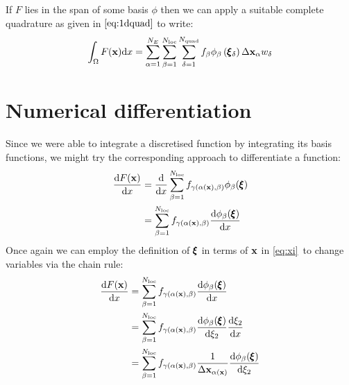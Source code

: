 \documentclass[a4paper, 11pt]{book}
\begin{document}
If $F$ lies in the span of some basis $\phi$ then we can apply a suitable
complete quadrature as given in $\eqref{eq:1dquad}$ to write:
\begin{equation}
  \int_\Omega F(\mathbf{x})\mathrm{d} x = \sum_{\alpha=1}^{N_E}\sum_{\beta=1}^{N_\mathrm{loc}}
  \sum_{\delta=1}^{N_\mathrm{quad}} f_{\beta}
  \phi_{\beta}\left(\pmb{\xi}_\delta\right)\Delta\mathbf{x}_\alpha w_\delta
\end{equation}

\section{Numerical differentiation}

Since we were able to integrate a discretised function by integrating its
basis functions, we might try the corresponding approach to differentiate a
function:
\begin{equation}
  \begin{split}
    \frac{\mathrm{d} F(\mathbf{x})}{\mathrm{d} x}&=\frac{\mathrm{d}}{\mathrm{d} x}\sum_{\beta=1}^{N_\mathrm{loc}}
    f_{\gamma(\alpha(\mathbf{x}),\beta)}\phi_{\beta}(\pmb{\xi})\\
    &=\sum_{\beta=1}^{N_\mathrm{loc}}
    f_{\gamma(\alpha(\mathbf{x}),\beta)}\frac{\mathrm{d} \phi_{\beta}(\pmb{\xi})}{\mathrm{d} x}
  \end{split}
\end{equation}
Once again we can employ the definition of $\pmb{\xi}$ in terms of $\mathbf{x}$ in
\eqref{eq:xi}\ to change variables via the chain rule:
\begin{equation}\label{eq:1dpointdfdx}
  \begin{split}
    \frac{\mathrm{d} F(\mathbf{x})}{\mathrm{d} x}&=\sum_{\beta=1}^{N_\mathrm{loc}}
    f_{\gamma(\alpha(\mathbf{x}),\beta)}\frac{\mathrm{d} \phi_{\beta}(\pmb{\xi})}{\mathrm{d} x}\\
    &=\sum_{\beta=1}^{N_\mathrm{loc}}
    f_{\gamma(\alpha(\mathbf{x}),\beta)}\frac{\mathrm{d} \phi_{\beta}(\pmb{\xi})}{\mathrm{d} \xi_2}
    \frac{\mathrm{d}\xi_2}{\mathrm{d} x}\\
    &=\sum_{\beta=1}^{N_\mathrm{loc}}
    f_{\gamma(\alpha(\mathbf{x}),\beta)}\frac{1}{\Delta\mathbf{x}_{\alpha(\mathbf{x})}}\frac{\mathrm{d} \phi_{\beta}(\pmb{\xi})}{\mathrm{d} \xi_2}\\
  \end{split}
\end{equation}
\end{document}
